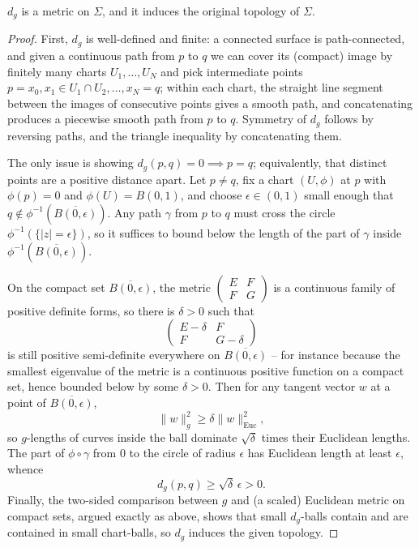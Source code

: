 \begin{proposition}
    $d_g$ is a metric on $\Sigma$, and it induces the original topology of $\Sigma$.
\end{proposition}
\begin{proof}
    First, $d_g$ is well-defined and finite: a connected surface is path-connected, and given a continuous path from $p$ to $q$ we can cover its (compact) image by finitely many charts $U_1, \dots, U_N$ and pick intermediate points $p = x_0, x_1 \in U_1 \cap U_2, \dots, x_N = q$; within each chart, the straight line segment between the images of consecutive points gives a smooth path, and concatenating produces a piecewise smooth path from $p$ to $q$. Symmetry of $d_g$ follows by reversing paths, and the triangle inequality by concatenating them.

    The only issue is showing $d_g(p, q) = 0 \implies p = q$; equivalently, that distinct points are a positive distance apart. Let $p \neq q$, fix a chart $(U, \phi)$ at $p$ with $\phi(p) = 0$ and $\phi(U) = B(0, 1)$, and choose $\epsilon \in (0,1)$ small enough that $q \notin \phi^{-1}(\overline{B(0, \epsilon)})$. Any path $\gamma$ from $p$ to $q$ must cross the circle $\phi^{-1}(\{|z| = \epsilon\})$, so it suffices to bound below the length of the part of $\gamma$ inside $\phi^{-1}(\overline{B(0, \epsilon)})$.

    On the compact set $\overline{B(0,\epsilon)}$, the metric $\begin{pmatrix} E & F \\ F & G\end{pmatrix}$ is a continuous family of positive definite forms, so there is $\delta > 0$ such that
    $$
    \begin{pmatrix} E - \delta & F \\ F & G - \delta \end{pmatrix}
    $$
    is still positive semi-definite everywhere on $\overline{B(0,\epsilon)}$ -- for instance because the smallest eigenvalue of the metric is a continuous positive function on a compact set, hence bounded below by some $\delta > 0$. Then for any tangent vector $w$ at a point of $\overline{B(0, \epsilon)}$,
    $$
    \|w\|_g^2 \geq \delta \|w\|_{\text{Euc}}^2,
    $$
    so $g$-lengths of curves inside the ball dominate $\sqrt{\delta}$ times their Euclidean lengths. The part of $\phi \circ \gamma$ from $0$ to the circle of radius $\epsilon$ has Euclidean length at least $\epsilon$, whence
    $$
    d_g(p, q) \geq \sqrt{\delta}\, \epsilon > 0.
    $$
    Finally, the two-sided comparison between $g$ and (a scaled) Euclidean metric on compact sets, argued exactly as above, shows that small $d_g$-balls contain and are contained in small chart-balls, so $d_g$ induces the given topology.
\end{proof}

